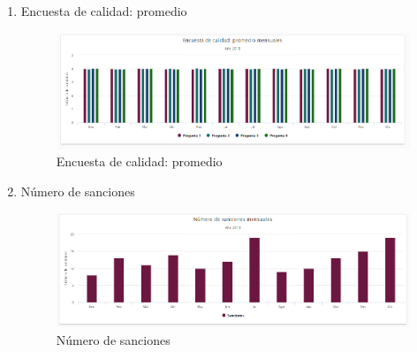 \begin{itemize}
\begin{enumerate}
	\item Encuesta de calidad: promedio
	\begin{figure}[hbtp]
	\includegraphics[scale=0.5]{images/Interfaz/IUGS15_encuestaCalidadMes.PNG}
	\caption{Encuesta de calidad: promedio}
	\end{figure}
	
	\item Número de sanciones 
	\begin{figure}[hbtp]
	\includegraphics[scale=0.5]{images/Interfaz/IUGS15_sancionesMes.PNG}
	\caption{Número de sanciones}
	\end{figure}
	
	\end{enumerate}
	
\end{itemize}